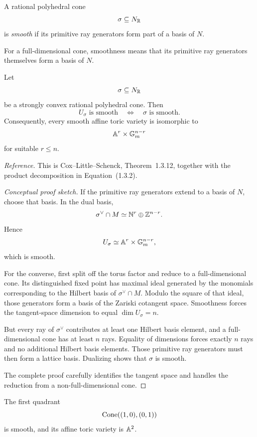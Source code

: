 \begin{definition}
A rational polyhedral cone
\[
\sigma\subseteq N_{\mathbb{R}}
\]
is \emph{smooth} if its primitive ray generators form part of a basis
of \(N\).
\end{definition}

For a full-dimensional cone, smoothness means that its primitive ray
generators themselves form a basis of \(N\).

\begin{theorem}
\label{thm:smoothness-criterion-affine-toric}
Let
\[
\sigma\subseteq N_{\mathbb{R}}
\]
be a strongly convex rational polyhedral cone. Then
\[
U_\sigma\text{ is smooth}
\quad\Longleftrightarrow\quad
\sigma\text{ is smooth}.
\]
Consequently, every smooth affine toric variety is isomorphic to
\[
\mathbb{A}^r\times\mathbb{G}_{m}^{n-r}
\]
for suitable \(r\leq n\).
\end{theorem}

\noindent
\textit{Reference.}
This is Cox--Little--Schenck, Theorem~1.3.12, together with the product
decomposition in Equation~(1.3.2).

\begin{proof}[Conceptual proof sketch]
If the primitive ray generators extend to a basis of \(N\), choose
that basis. In the dual basis,
\[
\sigma^\vee\cap M
\simeq
\mathbb{N}^r\oplus\mathbb{Z}^{n-r}.
\]
Hence
\[
U_\sigma
\simeq
\mathbb{A}^r\times\mathbb{G}_{m}^{n-r},
\]
which is smooth.

For the converse, first split off the torus factor and reduce to a
full-dimensional cone. Its distinguished fixed point has maximal
ideal generated by the monomials corresponding to the Hilbert basis
of \(\sigma^\vee\cap M\). Modulo the square of that ideal, those
generators form a basis of the Zariski cotangent space. Smoothness
forces the tangent-space dimension to equal \(\dim U_\sigma=n\).

But every ray of \(\sigma^\vee\) contributes at least one Hilbert
basis element, and a full-dimensional cone has at least \(n\) rays.
Equality of dimensions forces exactly \(n\) rays and no additional
Hilbert basis elements. Those primitive ray generators must then form
a lattice basis. Dualizing shows that \(\sigma\) is smooth.

The complete proof carefully identifies the tangent space and handles
the reduction from a non-full-dimensional cone.
\end{proof}

\begin{example}
The first quadrant
\[
\operatorname{Cone}((1,0),(0,1))
\]
is smooth, and its affine toric variety is \(\mathbb{A}^2\).
\end{example}

